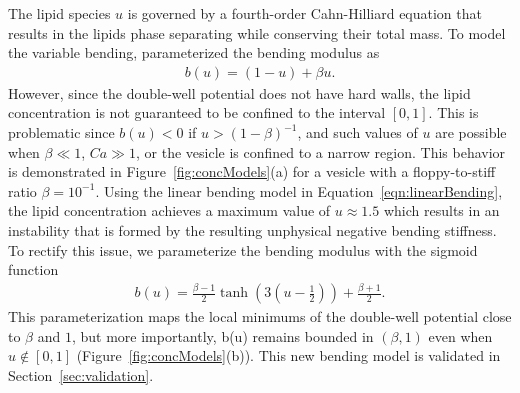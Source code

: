 \documentclass[twoside,twocolumn,9pt]{article}
\begin{document}
The lipid species $u$ is governed by a fourth-order Cahn-Hilliard
equation that results in the lipids phase separating while conserving
their total mass. To model the variable bending,
\citet{soh-tse-li-voi-low2010} parameterized the bending modulus as
\begin{align}
  \label{eqn:linearBending}
  b(u) = (1-u) + \beta u.
\end{align}
However, since the double-well potential does not have hard walls, the
lipid concentration is not guaranteed to be confined to the interval
$[0,1]$. This is problematic since $b(u) < 0$ if $u > (1 - \beta)^{-1}$,
and such values of $u$ are possible when $\beta \ll 1$, $Ca \gg 1$, or
the vesicle is confined to a narrow region. This behavior is
demonstrated in Figure~\ref{fig:concModels}(a) for a vesicle with a
floppy-to-stiff ratio $\beta = 10^{-1}$. Using the linear bending model
in Equation~\eqref{eqn:linearBending}, the lipid concentration achieves
a maximum value of $u \approx 1.5$ which results in an instability that
is formed by the resulting unphysical negative bending stiffness. To
rectify this issue, we parameterize the bending modulus with the sigmoid
function
\begin{align}
  b(u) = \frac{\beta-1}{2} \tanh\left(3\left(u-\frac{1}{2} 
    \right)\right) + \frac{\beta + 1}{2}.
  \label{eqn:tanhBending}
\end{align}
This parameterization maps the local minimums of the double-well
potential close to $\beta$ and $1$, but more importantly, b(u) remains
bounded in $(\beta,1)$ even when $u \notin [0,1]$
(Figure~\ref{fig:concModels}(b)). This new bending model is validated in
Section~\ref{sec:validation}.
\end{document}
